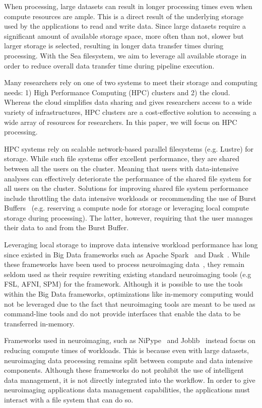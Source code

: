 \documentclass[10pt,journal,compsoc]{IEEEtran}
\begin{document}
When processing, large datasets can result in longer processing times even when compute resources are ample.
This is a direct result of the underlying storage used by the applications to read and write data. Since large
datasets require a significant amount of available storage space, more often than not, slower but larger storage is
selected, resulting in longer data transfer times during processing. With the Sea filesystem, we aim to
leverage all available storage in order to reduce overall data transfer time during pipeline execution.

Many researchers rely on one of two systems to meet their storage and computing needs: 1) High Performance 
Computing (HPC) clusters and 2) the cloud. Whereas the cloud simplifies data sharing and gives researchers
access to a wide variety of infrastructures, HPC clusters are a cost-effective solution to accessing a wide
array of resources for researchers. In this paper, we will focus on HPC processing.

HPC systems rely on scalable network-based parallel filesystems (e.g. Lustre) for storage. While such file
systems offer excellent performance, they are shared between all the users on the cluster. Meaning that users
with data-intensive analyses can effectively deteriorate the performance of the shared file system for all users on
the cluster. Solutions for improving shared file system performance include throttling the data intensive workloads
or recommending the use of Burst Buffers~\cite{bb} (e.g. reserving a compute node for storage or leveraging
local compute storage during processing). The latter, however, requiring that the user manages their data to
and from the Burst Buffer.

Leveraging local storage to improve data intensive workload performance has long since existed in Big Data
frameworks such as Apache Spark~\cite{spark} and Dask~\cite{dask}. While these frameworks have been used to
process neuroimaging data~\cite{manypapers}, they remain seldom used as their require rewriting existing
standard neuroimaging tools (e.g FSL, AFNI, SPM) for the framework. Although it is possible to use the
tools within the Big Data frameworks, optimizations like in-memory computing would not be leveraged due to 
the fact that neuroimaging tools are meant to be used as command-line tools and do not provide interfaces that 
enable the data to be transferred in-memory.

Frameworks used in neuroimaging, such as NiPype~\cite{nipype} and Joblib~\cite{joblib} instead focus on reducing compute times of workloads.
This is because even with large datasets, neuroimaging data processing remains split between compute and data
intensive components. Although these frameworks do not prohibit the use of intelligent data management, it is not directly integrated
into the workflow. In order to give neuroimaging applications data management capabilities, the applications must interact with a
file system that can do so.
\end{document}
